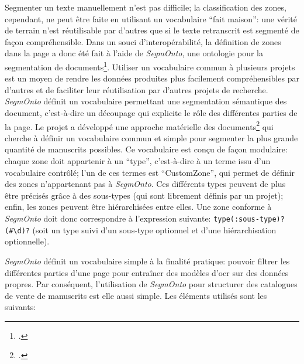 Segmenter un texte manuellement n'est pas difficile; la classification des zones, cependant, ne peut être faite en utilisant un vocabulaire \enquote{fait maison}: une vérité de terrain n'est réutilisable par d'autres que si le texte retranscrit est segmenté de façon compréhensible. Dans un souci d'interopérabilité, la définition de zones dans la page a donc été fait à l'aide de \textit{SegmOnto}, une ontologie pour la segmentation de documents\footcite{christensen_segmonto_2022, gabay_segmonto_2021}. Utiliser un vocabulaire commun à plusieurs projets est un moyen de rendre les données produites plus facilement compréhensibles par d'autres et de faciliter leur réutilisation par d'autres projets de recherche. \textit{SegmOnto} définit un vocabulaire permettant une segmentation sémantique des document, c'est-à-dire un découpage qui explicite le rôle des différentes parties de la page. Le projet a développé une approche matérielle des documents\footcite{gabay_segmonto_2021} qui cherche à définir un vocabulaire commun et simple pour segmenter la plus grande quantité de manuscrits possibles. Ce vocabulaire est conçu de façon modulaire: chaque zone doit appartenir à un \enquote{type}, c'est-à-dire à un terme issu d'un vocabulaire contrôlé; l'un de ces termes est \enquote{CustomZone}, qui permet de définir des zones n'appartenant pas à \textit{SegmOnto}. Ces différents types peuvent de plus être précisés grâce à des sous-types (qui sont librement définis par un projet); enfin, les zones peuvent être hiérarchisées entre elles. Une zone conforme à \textit{SegmOnto} doit donc correspondre à l'expression suivante: \texttt{type(:sous-type)?(\#\textbackslash{}d)?} (soit un type suivi d'un sous-type optionnel et d'une hiérarchisation optionnelle).

\textit{SegmOnto} définit un vocabulaire simple à la finalité pratique: pouvoir filtrer les différentes parties d'une page pour entraîner des modèles d'\gls{ocr} sur des données propres. Par conséquent, l'utilisation de \textit{SegmOnto} pour structurer des catalogues de vente de manuscrits est elle aussi simple. Les éléments utilisés sont les suivants:

